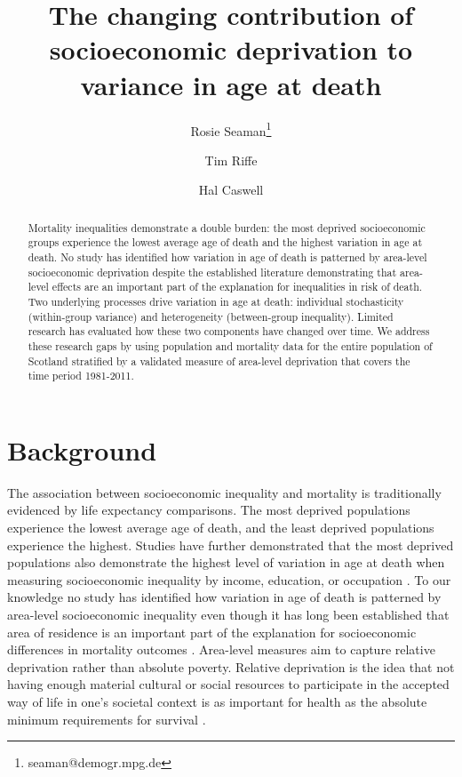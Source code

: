 \documentclass[12pt,oneside,a4paper]{article} %
\theoremstyle{definition}
\begin{document}
\title{The changing contribution of socioeconomic deprivation to variance in age at death}
\author[1]{Rosie Seaman\thanks{seaman@demogr.mpg.de}}
\author[1]{Tim Riffe}
\author[2]{Hal Caswell}


\maketitle

\begin{abstract}
Mortality inequalities demonstrate a double burden: the most deprived socioeconomic
groups experience the lowest average age of death and the highest variation in age at death. No study has identified how variation in age of death is patterned by area-level socioeconomic deprivation despite the established literature demonstrating that area-level effects are an important part of the explanation for inequalities in risk of death. Two underlying processes drive variation in age at death: individual stochasticity (within-group variance) and heterogeneity (between-group inequality). Limited research has evaluated how these two components have changed over time. We address these research gaps by using population and mortality data for the entire population of Scotland stratified by a validated measure of area-level deprivation that covers the time period 1981-2011.
\end{abstract}

\section{Background}
The association between socioeconomic inequality and mortality is traditionally
evidenced by life expectancy comparisons. The most deprived populations
experience the lowest average age of death, and the least deprived populations
experience the highest. Studies have further demonstrated that the most deprived
populations also demonstrate the highest level of variation in age at death when
measuring socioeconomic inequality by income, education, or occupation \citep{Broennum-Hansen2017,Raalte2011,Sasson2016,Raalte2014}. To our knowledge no study has identified how variation in age
of death is patterned by area-level socioeconomic inequality even though it has long been established that area of residence is
an important part of the explanation for socioeconomic differences in mortality
outcomes \citep{Carstairs1989,Macintyre2002,Tunstall2011}. Area-level measures aim to capture relative deprivation rather than absolute
poverty. Relative deprivation is the idea that not having enough material
cultural or social resources to participate in the accepted way of life in one's
societal context is as important for health as the absolute minimum requirements
for survival \citep{Kearns2000,Carstairs1989,Townsend1987} .
 
\end{document}
